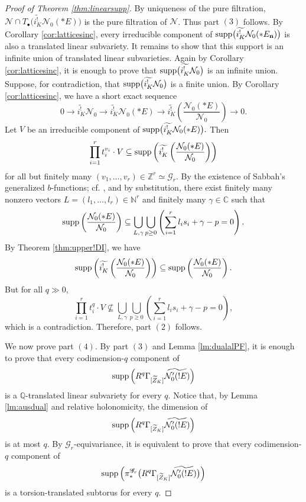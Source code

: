 \documentclass{amsart}
\theoremstyle{plain}
\numberwithin{theorem}{section}
\theoremstyle{definition}
\theoremstyle{remark}
\theoremstyle{definition}
\newcommand{\wt}{\widetilde}
\newcommand{\C}{\mathbb{C}} %
\newcommand{\N}{\mathbb{N}}
\newcommand{\Q}{\mathbb{Q}}
\newcommand{\Z}{\mathbb{Z}}
\newcommand{\cN}{\mathcal{N}}
\newcommand{\bn}{\mathbf{n}}
\newcommand{\sN}{\mathscr{N}}
\newcommand{\sG}{\mathscr{G}}
\newcommand{\supp}{\textup{supp}}
\begin{document}
\begin{proof}[Proof of Theorem \ref{thm:linearsupp}]
By uniqueness of the pure filtration,
$\sN\cap T_\bullet\big(\wt{i^!_K}\cN_0(*E)\big)$
is the pure filtration of $\sN$. Thus part $(3)$ follows. By Corollary
\ref{cor:latticesinc}, every irreducible component of
$\supp\big(\wt{i^!_K}\cN_0(*E_\bn)\big)$
is also a translated linear subvariety. It remains to show that this support
is an infinite union of translated linear subvarieties. Again by Corollary
\ref{cor:latticesinc}, it is enough to prove that
$\supp\big(\wt{i^!_K}\cN_0\big)$
is an infinite union.
Suppose, for contradiction, that
$\supp\big(\wt{i^!_K}\cN_0\big)$
is a finite union. By Corollary \ref{cor:latticesinc}, we have a short exact
sequence
\[
0\to
\wt{i^!_K}\cN_0
\to
\wt{i^!_K}\cN_0(*E)
\to
\wt{i^!_K}
\left(
\frac{\cN_0(*E)}{\cN_0}
\right)
\to 0.
\]
Let $V$ be an irreducible component of
$\supp\big(\wt{i^!_K}\cN_0(*E)\big).$
Then
\[
\prod_{i=1}^r t_i^{v_i}\cdot V
\subseteq
\supp
\left(
\wt{i^!_K}
\left(
\frac{\cN_0(*E)}{\cN_0}
\right)
\right)
\]
for all but finitely many
$(v_1,\dots,v_r)\in \Z^r\simeq \sG_r.$
By the existence of Sabbah's generalized $b$-functions; cf.
\cite[Thm.2.1]{WuRHA}, and by substitution, there exist finitely many
nonzero vectors
$L=(l_1,\dots,l_r)\in \N^r$
and finitely many $\gamma\in\C$ such that
\[
\supp
\left(
\frac{\cN_0(*E)}{\cN_0}
\right)
\subseteq
\bigcup_{L,\gamma}
\bigcup_{p\ge 0}
\left(
\sum_{i=1}^r l_is_i+\gamma-p=0
\right).
\]
By Theorem \ref{thm:upper!DI}, we have
\[
\supp
\left(
\wt{i^!_K}
\left(
\frac{\cN_0(*E)}{\cN_0}
\right)
\right)
\subseteq
\supp
\left(
\frac{\cN_0(*E)}{\cN_0}
\right).
\]
But for all $q\gg 0$,
\[
\prod_{i=1}^r t_i^q\cdot V
\not\subseteq
\bigcup_{L,\gamma}
\bigcup_{p\ge 0}
\left(
\sum_{i=1}^r l_is_i+\gamma-p=0
\right),
\]
which is a contradiction. Therefore, part $(2)$ follows.

We now prove part $(4)$. By part $(3)$ and Lemma \ref{lm:dualalPF}, it is
enough to prove that every codimension-$q$ component of
\[
\supp
\left(
R^q\Gamma_{[\wt Z_K]}\wt{\cN_0'(!E)}
\right)
\]
is a $\Q$-translated linear subvariety for every $q$. Notice that, by
Lemma \ref{lm:ausdual} and relative holonomicity, the dimension of
\[
\supp
\left(
R^q\Gamma_{[\wt Z_K]}\wt{\cN_0'(!E)}
\right)
\]
is at most $q$. By $\sG_r$-equivariance, it is equivalent to prove that every
codimension-$q$ component of
\[
\supp
\left(
\pi_*^{\sG_r}
\big(
R^q\Gamma_{[\wt Z_K]}\wt{\cN_0'(!E)}
\big)
\right)
\]
is a torsion-translated subtorus for every $q$.


\end{proof}
\end{document}
